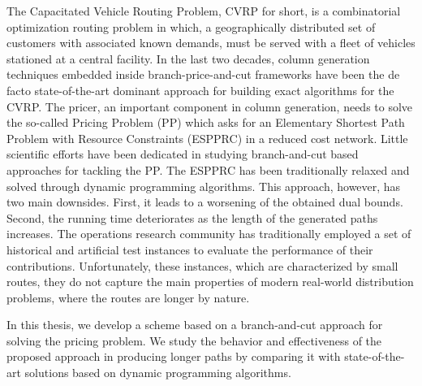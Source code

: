 \noindent The Capacitated Vehicle Routing Problem, CVRP for short,
is a combinatorial optimization routing problem in which,
a geographically distributed set of customers with associated known demands,
must be served with a fleet of vehicles stationed at a central facility.
In the last two decades,
column generation techniques embedded inside branch-price-and-cut frameworks
have been the de facto state-of-the-art dominant approach
for building exact algorithms for the CVRP.
The pricer, an important component in column generation, needs to solve
the so-called Pricing Problem (PP) which asks for an
Elementary Shortest Path Problem with Resource Constraints (ESPPRC)
in a reduced cost network.
Little scientific efforts have been dedicated in studying
branch-and-cut based approaches for tackling the PP.
The ESPPRC has been traditionally relaxed and solved through dynamic programming
algorithms.
This approach, however, has two main downsides.
First, it leads to a worsening of the obtained dual bounds.
Second, the running time deteriorates as the length of the generated paths increases.
The operations research community has traditionally employed
a set of historical and artificial test instances to evaluate
the performance of their contributions.
Unfortunately, these instances, which are characterized by small routes,
they do not capture the main properties of modern real-world distribution problems,
where the routes are longer by nature.

\noindent In this thesis, we develop
a scheme based on a branch-and-cut approach for solving the pricing problem.
We study the behavior and effectiveness of the proposed approach in producing longer paths
by comparing it with state-of-the-art solutions based on dynamic programming algorithms.
